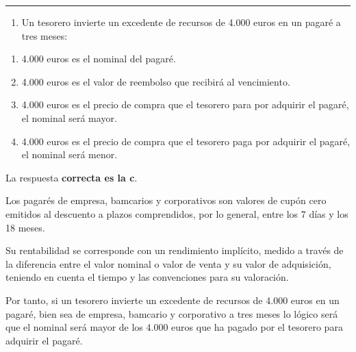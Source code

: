 \documentclass[
  letterpaper,
  DIV=11,
  numbers=noendperiod]{scrreprt}
\providecommand{\tightlist}{%
  \setlength{\itemsep}{0pt}\setlength{\parskip}{0pt}}\usepackage{longtable,booktabs,array}
\begin{document}
\begin{center}\rule{0.5\linewidth}{0.5pt}\end{center}

\begin{enumerate}
\def\labelenumi{\arabic{enumi}.}
\setcounter{enumi}{97}
\tightlist
\item
  Un tesorero invierte un excedente de recursos de 4.000 euros en un
  pagaré a tres meses:
\end{enumerate}

\begin{enumerate}
\def\labelenumi{\alph{enumi})}
\item
  4.000 euros es el nominal del pagaré.
\item
  4.000 euros es el valor de reembolso que recibirá al vencimiento.
\item
  4.000 euros es el precio de compra que el tesorero para por adquirir
  el pagaré, el nominal será mayor.
\item
  4.000 euros es el precio de compra que el tesorero paga por adquirir
  el pagaré, el nominal será menor.
\end{enumerate}

\begin{tcolorbox}[enhanced jigsaw, left=2mm, opacityback=0, colback=white, breakable, arc=.35mm, bottomrule=.15mm, rightrule=.15mm, toprule=.15mm, leftrule=.75mm, colframe=quarto-callout-tip-color-frame]
\begin{minipage}[t]{5.5mm}
\textcolor{quarto-callout-tip-color}{\faLightbulb}
\end{minipage}%
\begin{minipage}[t]{\textwidth - 5.5mm}

La respuesta \textbf{correcta es la c}.

Los pagarés de empresa, bamcarios y corporativos son valores de cupón
cero emitidos al descuento a plazos comprendidos, por lo general, entre
los 7 días y los 18 meses.

Su rentabilidad se corresponde con un rendimiento implícito, medido a
través de la diferencia entre el valor nominal o valor de venta y su
valor de adquisición, teniendo en cuenta el tiempo y las convenciones
para su valoración.

Por tanto, si un tesorero invierte un excedente de recursos de 4.000
euros en un pagaré, bien sea de empresa, bamcario y corporativo a tres
meses lo lógico será que el nominal será mayor de los 4.000 euros que ha
pagado por el tesorero para adquirir el pagaré.

\end{minipage}%
\end{tcolorbox}
\end{document}
